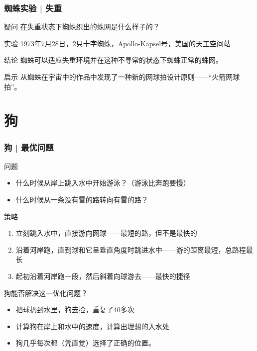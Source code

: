 \begin{frame}
  \frametitle{蜘蛛实验 | 失重}
  \begin{block}{疑问}
    在失重状态下蜘蛛织出的蛛网是什么样子的？
  \end{block}
  \pause
  \begin{block}{实验}
    1973年7月28日，2只十字蜘蛛，Apollo-Kapsel号，美国的天工空间站
  \end{block}
  \pause
  \begin{block}{结论}
    蜘蛛可以适应失重环境并在这种不寻常的状态下蜘蛛正常的蛛网。
  \end{block}
  \pause
  \begin{block}{启示}
   从蜘蛛在宇宙中的作品中发现了一种新的网球拍设计原则——“火箭网球拍”。
  \end{block}
\end{frame}

\section{狗}
\begin{frame}
  \frametitle{狗 | 最优问题}
  \begin{block}{问题}
    \begin{itemize}
      \item 什么时候从岸上跳入水中开始游泳？（游泳比奔跑要慢）
      \item 什么时候从一条没有雪的路转向有雪的路？
    \end{itemize}
  \end{block}
  \vspace{-0.3em}
  \pause
  \begin{block}{策略}
    \begin{enumerate}
      \item 立刻跳入水中，直接游向网球——最短的路，但不是最快的
      \item 沿着河岸跑，直到球和它呈垂直角度时跳进水中——游的距离最短，总路程最长
      \item 起初沿着河岸跑一段，然后斜着向球游去——最快的捷径
    \end{enumerate}
  \end{block}
  \vspace{-0.3em}
  \pause
  \begin{block}{狗能否解决这一优化问题？}
    \begin{itemize}
      \item 把球扔到水里，狗去捡，重复了40多次
      \item 计算狗在岸上和水中的速度，计算出理想的入水处
      \item 狗几乎每次都（凭直觉）选择了正确的位置。
    \end{itemize}
  \end{block}
\end{frame}

